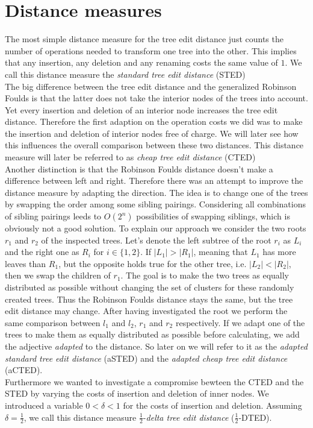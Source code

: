 \section{Distance measures}
The most simple distance measure for the tree edit distance just counts the number of operations needed to transform one tree into the other. This implies that any insertion, any deletion and any renaming costs the same value of $1$. We call this distance measure the \textit{standard tree edit distance} (STED)\\
The big difference between the tree edit distance and the generalized Robinson Foulds is that the latter does not take the interior nodes of the trees into account. Yet every insertion and deletion of an interior node increases the tree edit distance. Therefore the first adaption on the operation costs we did was to make the insertion and deletion of interior nodes free of charge. We will later see how this influences the overall comparison between these two distances. This distance measure will later be referred to as \textit{cheap tree edit distance} (CTED)\\
Another distinction is that the Robinson Foulds distance doesn't make a difference between left and right. Therefore there was an attempt to improve the distance measure by adapting the direction. The idea is to change one of the trees by swapping the order among some sibling pairings. Considering all combinations of sibling pairings leeds to $O(2^n)$ possibilities of swapping siblings, which is obviously not a good solution. To explain our approach we consider the two roots $r_1$ and $r_2$ of the inspected trees.
Let's denote the left subtree of the root $r_i$ as $L_i$ and the right one as $R_i$ for $i \in \{1,2\}$. If $|L_1| > |R_1|$, meaning that $L_1$ has more leaves than $R_1$, but the opposite holds true for the other tree, i.e. $|L_2| < |R_2|$, then we swap the children of $r_1$. The goal is to make the two trees as equally distributed as possible without changing the set of clusters for these randomly created trees. Thus the Robinson Foulds distance stays the same, but the tree edit distance may change. After having investigated the root we perform the same comparison between $l_1$ and $l_2$, $r_1$ and $r_2$ respectively. If we adapt one of the trees to make them as equally distributed as possible before calculating, we add the adjective \textit{adapted} to the distance. So later on we will refer to it as the \textit{adapted standard tree edit distance} (aSTED) and the \textit{adapted cheap tree edit distance} (aCTED).\\
Furthermore we wanted to investigate a compromise bewteen the CTED and the STED by varying the costs of insertion and deletion of inner nodes. We introduced a variable $0 < \delta < 1$ for the costs of insertion and deletion. Assuming $\delta = \frac{1}{2}$,  we call this distance measure $\frac{1}{2}$-\textit{delta tree edit distance} ($\frac{1}{2}$-DTED).

